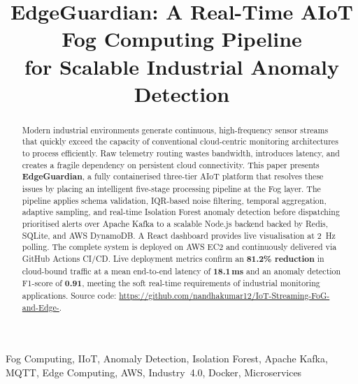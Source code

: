 \documentclass[conference]{IEEEtran}
\begin{document}
\title{EdgeGuardian: A Real-Time AIoT Fog Computing Pipeline\\
for Scalable Industrial Anomaly Detection}

\author{
}

\maketitle

\begin{abstract}
Modern industrial environments generate continuous, high-frequency sensor
streams that quickly exceed the capacity of conventional cloud-centric
monitoring architectures to process efficiently. Raw telemetry routing
wastes bandwidth, introduces latency, and creates a fragile dependency on
persistent cloud connectivity. This paper presents \textbf{EdgeGuardian}, a
fully containerised three-tier AIoT platform that resolves these issues by
placing an intelligent five-stage processing pipeline at the Fog layer.
The pipeline applies schema validation, IQR-based noise filtering, temporal
aggregation, adaptive sampling, and real-time Isolation Forest anomaly
detection before dispatching prioritised alerts over Apache Kafka to a
scalable Node.js backend backed by Redis, SQLite, and AWS DynamoDB. A React
dashboard provides live visualisation at 2~Hz polling. The complete system
is deployed on AWS EC2 and continuously delivered via GitHub Actions CI/CD.
Live deployment metrics confirm an \textbf{81.2\% reduction} in
cloud-bound traffic at a mean end-to-end latency of \textbf{18.1\,ms} and
an anomaly detection F1-score of \textbf{0.91}, meeting the soft real-time
requirements of industrial monitoring applications. Source code:
\url{https://github.com/nandhakumar12/IoT-Streaming-FoG-and-Edge-}.
\end{abstract}

\begin{IEEEkeywords}
Fog Computing, IIoT, Anomaly Detection, Isolation Forest, Apache Kafka,
MQTT, Edge Computing, AWS, Industry~4.0, Docker, Microservices
\end{IEEEkeywords}
\end{document}
